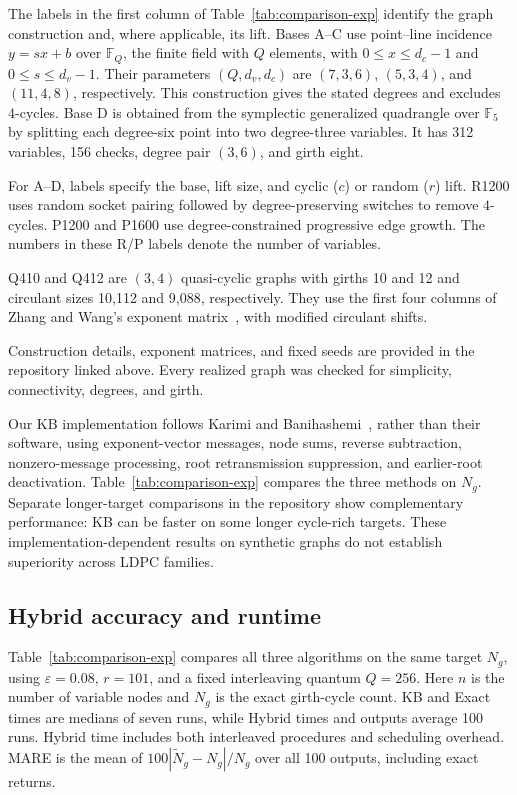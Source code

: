 \documentclass[conference]{IEEEtran}
\begin{document}
The labels in the first column of Table~\ref{tab:comparison-exp}
identify the graph construction and, where applicable, its lift.
Bases A--C use point--line incidence $y=sx+b$ over $\mathbb F_Q$,
the finite field with $Q$ elements, with
$0\le x \le d_c-1$ and $0\le s\le d_v-1$.
Their parameters $(Q,d_v,d_c)$ are $(7,3,6)$, $(5,3,4)$, and
$(11,4,8)$, respectively. This construction gives the stated degrees
and excludes $4$-cycles.
Base D is obtained from the symplectic generalized quadrangle over
$\mathbb F_5$ by splitting each degree-six point into two degree-three
variables. It has 312 variables, 156 checks, degree pair $(3,6)$,
and girth eight.

For A--D, labels specify the base, lift size, and cyclic ($c$) or
random ($r$) lift.
R1200 uses random socket pairing followed by
degree-preserving switches to remove $4$-cycles.
P1200 and P1600 use degree-constrained progressive edge growth.
The numbers in these R/P labels denote the number of variables.

Q410 and Q412 are $(3,4)$ quasi-cyclic graphs with girths 10 and 12
and circulant sizes 10,112 and 9,088, respectively.
They use the first four columns of Zhang and Wang's exponent
matrix~\cite{zhang2010}, with modified circulant shifts.

Construction details, exponent matrices, and fixed seeds are provided
in the repository linked above. Every realized graph was checked for
simplicity, connectivity, degrees, and girth.

Our KB implementation follows Karimi and
Banihashemi~\cite{karimi2013}, rather than their
software, using exponent-vector messages,
node sums, reverse subtraction, nonzero-message
processing, root retransmission suppression,
and earlier-root deactivation.
Table~\ref{tab:comparison-exp} compares the three methods on $N_g$.
Separate longer-target comparisons in the repository show complementary
performance: KB can be faster on some longer cycle-rich targets.
These implementation-dependent results on synthetic graphs
do not establish superiority across LDPC families.

\subsection{Hybrid accuracy and runtime}
Table~\ref{tab:comparison-exp} compares all three algorithms on the
same target $N_g$, using $\varepsilon=0.08$, $r=101$, and a fixed
interleaving quantum $Q=256$. Here $n$ is the number of variable
nodes and $N_g$ is the exact girth-cycle count.
KB and Exact times are medians of seven runs, while Hybrid times
and outputs average 100 runs. Hybrid time includes both interleaved
procedures and scheduling overhead. MARE is the mean of
$100|\widetilde N_g-N_g|/N_g$ over all 100 outputs,
including exact returns.
\end{document}
